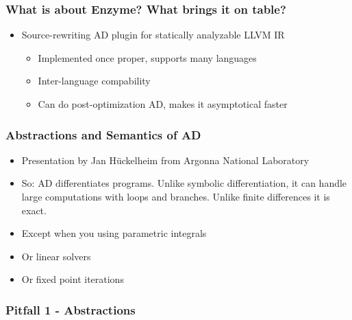 \documentclass[11pt]{beamer}
\begin{document}
\begin{frame}
	\frametitle{What is about Enzyme? What brings it on table?}

	\begin{itemize}
		\item Source-rewriting AD plugin for statically analyzable LLVM IR
			\begin{itemize}
				\item Implemented once proper, supports many languages
				\item Inter-language compability
				\item<2-> Can do post-optimization AD, makes it asymptotical faster
			\end{itemize}
	\end{itemize}

\end{frame}

\begin{frame}
	\frametitle{Abstractions and Semantics of AD}

	\begin{itemize}
		\item Presentation by Jan Hückelheim from Argonna National Laboratory
		\item So: AD differentiates programs. Unlike symbolic differentiation, it can handle large computations with loops and branches. Unlike finite differences it is exact.
		\item<2-> Except when you using parametric integrals
		\item<3-> Or linear solvers
		\item<4-> Or fixed point iterations
	\end{itemize}
\end{frame}

\begin{frame}
	\frametitle{Pitfall 1 - Abstractions}

	\begin{center}

	\end{center}
\end{frame}
\end{document}
